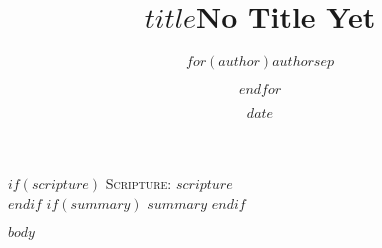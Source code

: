 \documentclass[Letter, 12pt]{report}
\title{$title$}
\title{No Title Yet}
\author{$for(author)$$author$$sep$ \and $endfor$}
\date{$date$}
\begin{document}
\maketitle
$if(scripture)$
\textsc{Scripture}: $scripture$ \\
$endif$
$if(summary)$
$summary$
$endif$

\pagebreak

$body$
\end{document}
